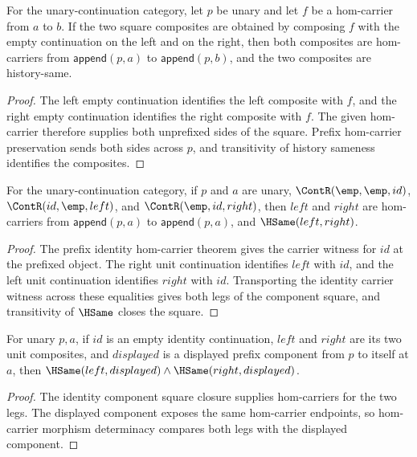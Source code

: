 \begin{theorem}
\label{thm:nattrans-prefix-identity-naturality-square}
For the unary-continuation category, let \(p\) be unary and let \(f\) be a
hom-carrier from \(a\) to \(b\). If the two square composites are obtained by
composing \(f\) with the empty continuation on the left and on the right, then
both composites are hom-carriers from \(\mathsf{append}(p,a)\) to
\(\mathsf{append}(p,b)\), and the two composites are history-same.
\end{theorem}
\begin{proof}
The left empty continuation identifies the left composite with \(f\), and
the right empty continuation identifies the right composite with \(f\). The
given hom-carrier therefore supplies both unprefixed sides of the square.
Prefix hom-carrier preservation sends both sides across \(p\), and
transitivity of history sameness identifies the composites.
\end{proof}

\begin{theorem}
\label{thm:nattrans-prefix-identity-component-square-closed}
For the unary-continuation category, if \(p\) and \(a\) are unary,
\(\ContR(\emp,\emp,id)\), \(\ContR(id,\emp,left)\), and
\(\ContR(\emp,id,right)\), then \(left\) and \(right\) are hom-carriers from
\(\mathsf{append}(p,a)\) to \(\mathsf{append}(p,a)\), and
\(\HSame(left,right)\).
\end{theorem}
\begin{proof}
The prefix identity hom-carrier theorem gives the carrier witness for \(id\)
at the prefixed object. The right unit continuation identifies \(left\) with
\(id\), and the left unit continuation identifies \(right\) with \(id\).
Transporting the identity carrier witness across these equalities gives both
legs of the component square, and transitivity of \(\HSame\) closes the
square.
\end{proof}

\begin{theorem}
\label{thm:nattrans-prefix-identity-component-square-public-readback}
For unary $p,a$, if $id$ is an empty identity continuation, $left$ and $right$
are its two unit composites, and $displayed$ is a displayed prefix component
from $p$ to itself at $a$, then
$\HSame(left,displayed)\wedge\HSame(right,displayed)$.
\end{theorem}
\begin{proof}
The identity component square closure supplies hom-carriers for the two legs.
The displayed component exposes the same hom-carrier endpoints, so hom-carrier
morphism determinacy compares both legs with the displayed component.
\end{proof}

